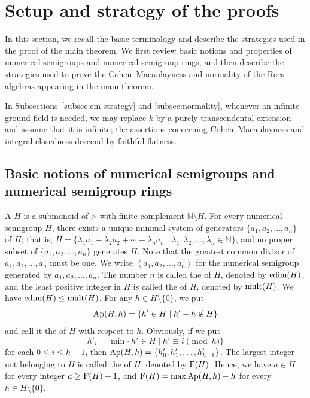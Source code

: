 \section{Setup and strategy of the proofs}
\label{sec:general-setup}

In this section, we recall the basic terminology and describe the strategies used in the proof of the main theorem.
We first review basic notions and properties of numerical semigroups and numerical semigroup rings, and then describe the strategies used to prove the Cohen--Macaulayness and normality of the Rees algebras appearing in the main theorem.

In Subsections~\ref{subsec:cm-strategy} and \ref{subsec:normality}, whenever
an infinite ground field is needed, we may replace $k$ by a purely
transcendental extension and assume that it is infinite; the assertions
concerning Cohen--Macaulayness and integral closedness descend by faithful
flatness.

\subsection{Basic notions of numerical semigroups and numerical semigroup rings}\label{subsec:basicnotion}

A  $H$ is a submonoid of $\mathbb{N}$ with finite complement $\mathbb{N} \setminus H$.
For every numerical semigroup $H$, there exists a unique minimal system of generators $\{a_1, a_2, \ldots , a_n\}$ of $H$; that is, $H=\{\lambda_1 a_1 + \lambda_2 a_2 + \cdots + \lambda_n a_n \mid \lambda_1, \lambda_2, \ldots , \lambda_n\in \mathbb{N}\}$, and no proper subset of $\{a_1,a_2,\ldots,a_n\}$ generates $H$. Note that the greatest common divisor of $a_1, a_2, \ldots , a_n$ must be one. 
We write $\left<a_1, a_2, \ldots , a_n\right>$ for the numerical semigroup generated by $a_1, a_2 ,\ldots , a_n$.
The number $n$ is called the  of $H$, denoted by $\operatorname{edim}(H)$, and the least positive integer in $H$ is called the  of $H$, denoted by $\operatorname{mult}(H)$.
We have $\operatorname{edim}(H)\leq\operatorname{mult}(H)$.
For any $h \in H \setminus \{0\}$, we put
$$
\operatorname{Ap}(H,h) = \{h' \in H \mid h' - h \notin H\}
$$
and call it the  of $H$ with respect to $h$. Obviously, if we put
$$
h'_i = \min \{h' \in H \mid h' \equiv i \pmod{h}\}
$$
for each $0 \le i \le h-1$, then $\operatorname{Ap}(H,h) = \{h'_0, h'_1, \ldots , h'_{h-1}\}$.
The largest integer not belonging to $H$ is called the  of $H$, denoted by $\operatorname{F}(H)$.
Hence, we have $a \in H$ for every integer $a \ge \operatorname{F}(H) + 1$, and $\operatorname{F}(H) = \max \operatorname{Ap}(H,h) - h$ for every $h \in H \setminus \{0\}$. 

